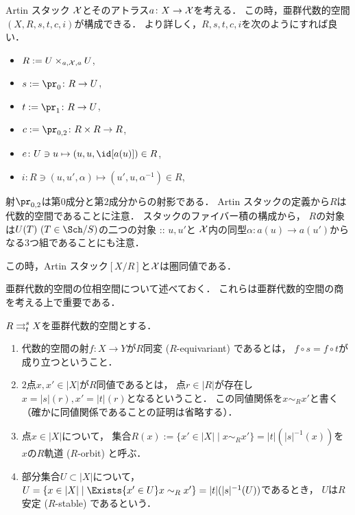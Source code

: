     \begin{Lemma}[\cite{SP} 04T4, 04T5]
        Artin スタック $\mathcal{X}$とそのアトラス$a \colon X \to \mathcal{X}$を考える．
        この時，亜群代数的空間$(X, R, s,t,c,i)$が構成できる．
        より詳しく，$R,s,t,c,i$を次のようにすれば良い．
        \begin{itemize}
            \item $R:=U \times_{a,\mathcal{X},a} U$,
            \item $s:=\pr_0 \colon R \to U$,
            \item $t:=\pr_1 \colon R \to U$,
            \item $c:=\pr_{0,2} \colon R \times R \to R$,
            \item $e \colon U \ni u \mapsto (u,u,\id[a(u)]) \in R$,
            \item $i \colon R \ni (u,u',\alpha) \mapsto (u',u,\alpha^{-1}) \in R$,
        \end{itemize}
        射$\pr_{0,2}$は第$0$成分と第$2$成分からの射影である．
        Artin スタックの定義から$R$は代数的空間であることに注意．
        スタックのファイバー積の構成から，
        $R$の対象は$U(T)\ (T \in \Sch/S)$の二つの対象 :: $u, u'$と
        $\mathcal{X}$内の同型$\alpha \colon a(u) \to a(u')$からなる$3$つ組であることにも注意．
        
        この時，Artin スタック$[X/R]$と$\mathcal{X}$は圏同値である．
    \end{Lemma}

    亜群代数的空間の位相空間について述べておく．
    これらは亜群代数的空間の商を考える上で重要である．

    \begin{Def}
        $R \mathrel{\mathop{\rightrightarrows}^{s}_{t}} X$を亜群代数的空間とする．
        \begin{enumerate}
        \item
            代数的空間の射$f \colon X \to Y$が$R$同変 ($R$-equivariant) であるとは，
            $f \circ s=f \circ t$が成り立つということ．

        \item
            $2$点$x,x' \in |X|$が$R$同値であるとは，
            点$r \in |R|$が存在し$x=|s|(r), x'=|t|(r)$となるということ．
            この同値関係を$x \sim_{R} x'$と書く
            （確かに同値関係であることの証明は省略する）．

        \item
            点$x \in |X|$について，
            集合$R(x):=\{ x' \in |X| \mid x \sim_{R} x' \}=|t|(|s|^{-1}(x))$を
            $x$の$R$軌道 ($R$-orbit) と呼ぶ．

        \item
            部分集合$U \subset |X|$について，
            $U=\{x \in |X| \mid \Exists{x' \in U} x \sim_{R} x'\}=|t|(|s|^{-1}(U))$であるとき，
            $U$は$R$安定 ($R$-stable) であるという．
        \end{enumerate}
    \end{Def}

